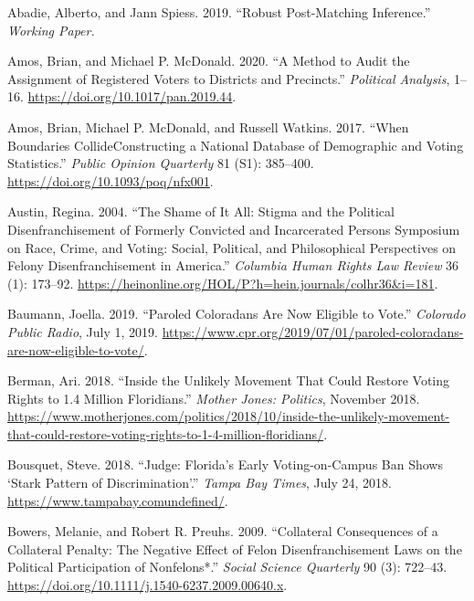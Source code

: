 \documentclass[
  12pt,
]{article}
\newlength{\cslhangindent}
\newenvironment{cslreferences}%
  {\setlength{\parindent}{0pt}%
  \everypar{\setlength{\hangindent}{\cslhangindent}}\ignorespaces}%
  {\par}
\begin{document}
\hypertarget{refs}{}
\begin{cslreferences}
\leavevmode\hypertarget{ref-Abadie2019}{}%
Abadie, Alberto, and Jann Spiess. 2019. ``Robust Post-Matching Inference.'' \emph{Working Paper.}

\leavevmode\hypertarget{ref-Amos2020}{}%
Amos, Brian, and Michael P. McDonald. 2020. ``A Method to Audit the Assignment of Registered Voters to Districts and Precincts.'' \emph{Political Analysis}, 1--16. \url{https://doi.org/10.1017/pan.2019.44}.

\leavevmode\hypertarget{ref-Amos2017}{}%
Amos, Brian, Michael P. McDonald, and Russell Watkins. 2017. ``When Boundaries CollideConstructing a National Database of Demographic and Voting Statistics.'' \emph{Public Opinion Quarterly} 81 (S1): 385--400. \url{https://doi.org/10.1093/poq/nfx001}.

\leavevmode\hypertarget{ref-Austin2004}{}%
Austin, Regina. 2004. ``The Shame of It All: Stigma and the Political Disenfranchisement of Formerly Convicted and Incarcerated Persons Symposium on Race, Crime, and Voting: Social, Political, and Philosophical Perspectives on Felony Disenfranchisement in America.'' \emph{Columbia Human Rights Law Review} 36 (1): 173--92. \url{https://heinonline.org/HOL/P?h=hein.journals/colhr36\&i=181}.

\leavevmode\hypertarget{ref-Baumann2019}{}%
Baumann, Joella. 2019. ``Paroled Coloradans Are Now Eligible to Vote.'' \emph{Colorado Public Radio}, July 1, 2019. \url{https://www.cpr.org/2019/07/01/paroled-coloradans-are-now-eligible-to-vote/}.

\leavevmode\hypertarget{ref-Berman2018}{}%
Berman, Ari. 2018. ``Inside the Unlikely Movement That Could Restore Voting Rights to 1.4 Million Floridians.'' \emph{Mother Jones: Politics}, November 2018. \url{https://www.motherjones.com/politics/2018/10/inside-the-unlikely-movement-that-could-restore-voting-rights-to-1-4-million-floridians/}.

\leavevmode\hypertarget{ref-Bousquet2018a}{}%
Bousquet, Steve. 2018. ``Judge: Florida's Early Voting-on-Campus Ban Shows `Stark Pattern of Discrimination'.'' \emph{Tampa Bay Times}, July 24, 2018. \url{https://www.tampabay.comundefined/}.

\leavevmode\hypertarget{ref-Bowers2009}{}%
Bowers, Melanie, and Robert R. Preuhs. 2009. ``Collateral Consequences of a Collateral Penalty: The Negative Effect of Felon Disenfranchisement Laws on the Political Participation of Nonfelons*.'' \emph{Social Science Quarterly} 90 (3): 722--43. \url{https://doi.org/10.1111/j.1540-6237.2009.00640.x}.


\end{cslreferences}
\end{document}
